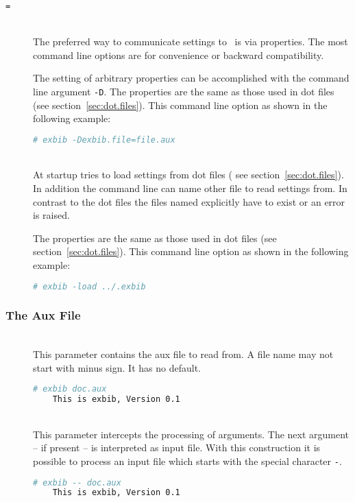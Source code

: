 \begin{description}
\item[\texttt{=}]\ \\
  
  The preferred way to communicate settings to \ExBib\ is via
  properties. The most command line options are for convenience or
  backward compatibility.
  
  The setting of arbitrary properties can be accomplished with the
  command line argument \texttt{-D}. The properties are the same as
  those used in dot files (see section~\ref{sec:dot.files}). This
  command line option as shown in the following example:

\begin{lstlisting}[language=sh]
# exbib -Dexbib.file=file.aux
\end{lstlisting}

\item[ ]\ \\
  
  At startup  tries to load settings from dot files ( see
  section~\ref{sec:dot.files}). In addition the command line can name
  other file to read settings from. In contrast to the dot files the
  files named explicitly have to exist or an error is raised.
  
  The properties are the same as those used in dot files (see
  section~\ref{sec:dot.files}). This command line option as shown in
  the following example:

\begin{lstlisting}[language=sh]
# exbib -load ../.exbib
\end{lstlisting}

\end{description}


\subsubsection{The Aux File}

\begin{description}
\item[]\ \\
  This parameter contains the aux file to read from. A file name may not
  start with minus sign. It has no default.
  \begin{lstlisting}[language=sh]
    # exbib doc.aux
    This is exbib, Version 0.1
  \end{lstlisting}
  
\item[\CLi{} ]
\item[\CLI{} ]\ \\
  This parameter intercepts the processing of arguments. The next
  argument -- if present -- is interpreted as input file. With this
  construction it is possible to process an input file which starts
  with the special character \verb|-|.
  \begin{lstlisting}[language=sh]
    # exbib -- doc.aux
    This is exbib, Version 0.1
  \end{lstlisting}

\end{description}

